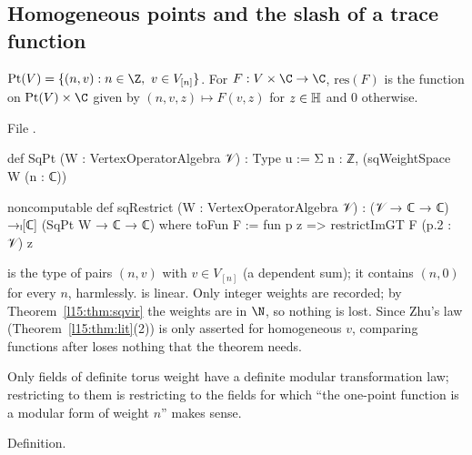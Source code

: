 \subsection{Homogeneous points and the slash of a trace function}

\begin{definition}\label{l15:def:sqpt}
$\mathrm{Pt}(V)=\{(n,v):n\in\Z,\ v\in V_{[n]}\}$. For $F:V\times\C\to\C$, $\mathrm{res}(F)$ is the function on
$\mathrm{Pt}(V)\times\C$ given by $(n,v,z)\mapsto F(v,z)$ for $z\in\mathbb{H}$ and $0$ otherwise.
\end{definition}
\noindent File .
\begin{leancode}
def SqPt (W : VertexOperatorAlgebra 𝒱) : Type u := Σ n : ℤ, (sqWeightSpace W (n : ℂ))

noncomputable def sqRestrict (W : VertexOperatorAlgebra 𝒱) :
    (𝒱 → ℂ → ℂ) →ₗ[ℂ] (SqPt W → ℂ → ℂ) where
  toFun F := fun p z => restrictImGT F (p.2 : 𝒱) z
\end{leancode}

\begin{dictionary}
 is the type of pairs $(n,v)$ with $v\in V_{[n]}$ (a dependent sum); it contains
$(n,0)$ for every $n$, harmlessly.  is linear. Only integer weights are recorded; by
Theorem~\ref{l15:thm:sqvir} the weights are in $\N$, so nothing is lost. Since Zhu's law
(Theorem~\ref{l15:thm:lit}(2)) is only asserted for homogeneous $v$, comparing functions after  loses
nothing that the theorem needs.
\end{dictionary}

\begin{physics}
Only fields of definite torus weight have a definite modular transformation law; restricting to them is restricting to
the fields for which ``the one-point function is a modular form of weight $n$'' makes sense.
\end{physics}

\begin{status}
Definition.
\end{status}

